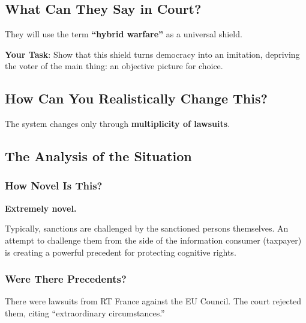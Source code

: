 \documentclass[11pt,a4paper]{article}
\theoremstyle{definition}
\theoremstyle{remark}
\begin{document}
\subsection{What Can They Say in Court?}

They will use the term \textbf{``hybrid warfare''} as a universal shield.

\textbf{Your Task}: Show that this shield turns democracy into an imitation, depriving the voter of the main thing: an objective picture for choice.

\subsection{How Can You Realistically Change This?}

The system changes only through \textbf{multiplicity of lawsuits}.

\begin{center}
\end{center}

\subsection{The Analysis of the Situation}

\subsubsection{How Novel Is This?}

\textbf{Extremely novel.}

Typically, sanctions are challenged by the sanctioned persons themselves. An attempt to challenge them from the side of the information consumer (taxpayer) is creating a powerful precedent for protecting cognitive rights.

\subsubsection{Were There Precedents?}

There were lawsuits from RT France against the EU Council. The court rejected them, citing ``extraordinary circumstances.''
\end{document}
